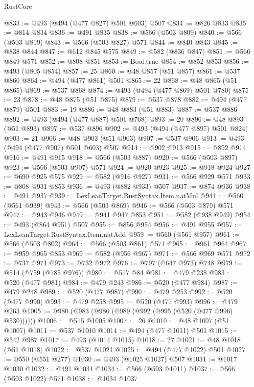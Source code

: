 \begin{lexlean}{RustCore}
\begin{coremodule}
@833 := @493 (@494 (@477 @827) @501 @603) @507
@834 := @826 @833
@835 := @814 @834
@836 := @491 @835
@838 := @566 (@503 @809)
@840 := @566 (@503 @819)
@843 := @566 (@503 @827) @571
@844 := @840 @843
@845 := @838 @844
@847 := @612 @845 @575
@849 := @582 (@836 @847)
@851 := @566 @849 @571
@852 := @808 @851
@853 := Bool.true
@854 := @852 @853
@856 := @493 (@805 @854)
@857 := 25
@860 := @48 @857 (@51 @857)
@861 := @537 @860
@864 := @494 (@477 @861) @501
@865 := 22
@868 := @48 @865 (@51 @865)
@869 := @537 @868
@874 := @493 (@494 (@477 @869) @501 @780)
@875 := 23
@878 := @48 @875 (@51 @875)
@879 := @537 @878
@882 := @494 (@477 @879) @501
@883 := 19
@886 := @48 @883 (@51 @883)
@887 := @537 @886
@892 := @493 (@494 (@477 @887) @501 @768)
@893 := 20
@896 := @48 @893 (@51 @893)
@897 := @537 @896
@902 := @493 (@494 (@477 @897) @501 @824)
@903 := 21
@906 := @48 @903 (@51 @903)
@907 := @537 @906
@913 := @493 (@494 (@477 @907) @501 @603) @507
@914 := @902 @913
@915 := @892 @914
@916 := @491 @915
@918 := @566 (@503 @887)
@920 := @566 (@503 @897)
@923 := @566 (@503 @907) @571
@924 := @920 @923
@925 := @918 @924
@927 := @690 @925 @575
@929 := @582 (@916 @927)
@931 := @566 @929 @571
@933 := @808 @931 @853
@936 := @493 (@882 @933) @507
@937 := @874 @936
@938 := @491 @937
@939 := LexLeanTarget.RustSyntax.Item.natMul
@941 := @560 (@561 @939)
@943 := @566 (@503 @869)
@946 := @566 (@503 @879) @571
@947 := @943 @946
@949 := @941 @947 @853
@951 := @582 (@938 @949)
@954 := @493 (@864 @951) @507
@955 := @856 @954
@956 := @491 @955
@957 := LexLeanTarget.RustSyntax.Item.natAdd
@959 := @560 (@561 @957)
@961 := @566 (@503 @802)
@964 := @566 (@503 @861) @571
@965 := @961 @964
@967 := @959 @965 @853
@969 := @582 (@956 @967)
@971 := @566 @969 @571
@972 := @737 @971
@973 := @732 @972
@976 := @797 (@647 @973) @748
@979 := @514 (@759 (@785 @976))
@980 := @517 @84
@981 := @479 @238
@983 := @520 (@477 @981)
@984 := @479 @243
@986 := @520 (@477 @984)
@987 := @479 @248
@989 := @520 (@477 @987)
@990 := @479 @253
@992 := @520 (@477 @990)
@993 := @479 @258
@995 := @520 (@477 @993)
@996 := @479 @263
@1005 := @980 (@983 (@986 (@989 (@992 (@995 (@520 (@477 @996) @530))))))
@1006 := @515 @1005
@1007 := 26
@1010 := @48 @1007 (@51 @1007)
@1011 := @537 @1010
@1014 := @494 (@477 @1011) @501
@1015 := @542 @987
@1017 := @493 (@1014 @1015)
@1018 := 27
@1021 := @48 @1018 (@51 @1018)
@1022 := @537 @1021
@1025 := @494 (@477 @1022) @501
@1027 := @550 (@551 @277)
@1030 := @493 (@1025 @1027) @507
@1031 := @1017 @1030
@1032 := @491 @1031
@1034 := @566 (@503 @1011)
@1037 := @566 (@503 @1022) @571
@1038 := @1034 @1037

\end{coremodule}
\end{lexlean}
